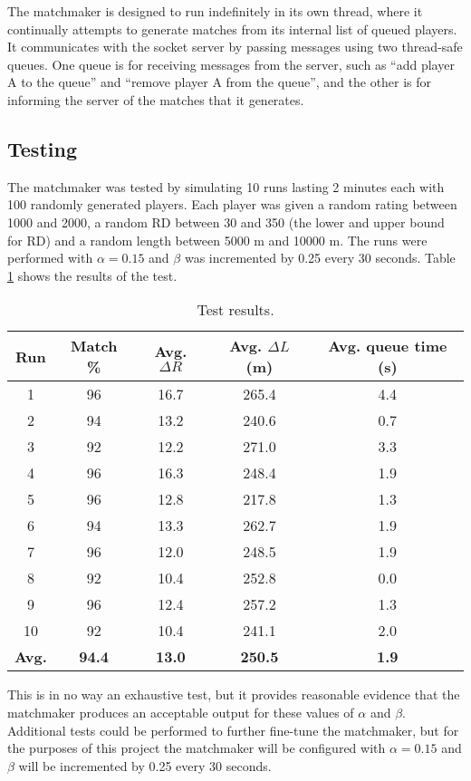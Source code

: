 The matchmaker is designed to run indefinitely in its own thread, where it continually attempts to generate matches from its internal list of queued players.
It communicates with the socket server by passing messages using two thread-safe queues.
One queue is for receiving messages from the server, such as ``add player A to the queue'' and ``remove player A from the queue'', and the other is for informing the server of the matches that it generates.

\subsection{Testing}
The matchmaker was tested by simulating 10 runs lasting 2 minutes each with 100 randomly generated players.
Each player was given a random rating between 1000 and 2000, a random RD between 30 and 350 (the lower and upper bound for RD) and a random length between 5000 m and 10000 m.
The runs were performed with $\alpha = 0.15$ and $\beta$ was incremented by 0.25 every 30 seconds.
Table \ref{tab:test_results} shows the results of the test.

\begin{table}[!ht]
	\centering
	\begin{tabular}{c | c c c c}
		\textbf{Run}	& \textbf{Match \%}		& \textbf{Avg. $\Delta R$}		& \textbf{Avg. $\Delta L$ (m)}		& \textbf{Avg. queue time (s)} \\
		\hline
		1				& 96					& 16.7							& 265.4								& 4.4 \\
		2				& 94					& 13.2							& 240.6								& 0.7 \\
		3				& 92					& 12.2							& 271.0								& 3.3 \\
		4				& 96					& 16.3							& 248.4								& 1.9 \\
		5				& 96					& 12.8							& 217.8								& 1.3 \\
		6				& 94					& 13.3							& 262.7								& 1.9 \\
		7				& 96					& 12.0							& 248.5								& 1.9 \\
		8				& 92					& 10.4							& 252.8								& 0.0 \\
		9				& 96					& 12.4							& 257.2								& 1.3 \\
		10				& 92					& 10.4							& 241.1								& 2.0 \\
		\hline\hline
		\textbf{Avg.}	& \textbf{94.4}			& \textbf{13.0}					& \textbf{250.5}					& \textbf{1.9}
	\end{tabular}
	\caption{Test results.}
	\label{tab:test_results}
\end{table}

This is in no way an exhaustive test, but it provides reasonable evidence that the matchmaker produces an acceptable output for these values of $\alpha$ and $\beta$.
Additional tests could be performed to further fine-tune the matchmaker, but for the purposes of this project the matchmaker will be configured with $\alpha = 0.15$ and $\beta$ will be incremented by 0.25 every 30 seconds.
